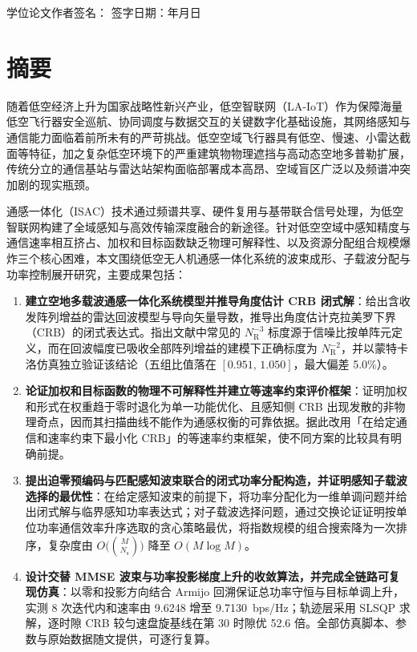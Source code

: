 \documentclass[12pt,a4paper,openany,UTF8]{ctexrep}
\begin{document}
\vspace{1.5cm}
\begin{flushright}
  学位论文作者签名：\underline{\hspace{3cm}} \qquad
  签字日期：\qquad 年\quad 月\quad 日
\end{flushright}
\newpage

\chapter*{摘\quad 要}

随着低空经济上升为国家战略性新兴产业，低空智联网（LA-IoT）作为保障海量低空飞行器安全巡航、协同调度与数据交互的关键数字化基础设施，其网络感知与通信能力面临着前所未有的严苛挑战。低空空域飞行器具有低空、慢速、小雷达截面等特征，加之复杂低空环境下的严重建筑物物理遮挡与高动态空地多普勒扩展，传统分立的通信基站与雷达站架构面临部署成本高昂、空域盲区广泛以及频谱冲突加剧的现实瓶颈。

通感一体化（ISAC）技术通过频谱共享、硬件复用与基带联合信号处理，为低空智联网构建了全域感知与高效传输深度融合的新途径。针对低空空域中感知精度与通信速率相互挤占、加权和目标函数缺乏物理可解释性、以及资源分配组合规模爆炸三个核心困难，本文围绕低空无人机通感一体化系统的波束成形、子载波分配与功率控制展开研究，主要成果包括：
\begin{enumerate}
  \item \textbf{建立空地多载波通感一体化系统模型并推导角度估计 CRB 闭式解}：给出含收发阵列增益的雷达回波模型与导向矢量导数，推导出角度估计克拉美罗下界（CRB）的闭式表达式。指出文献中常见的 $N_{\mathrm{R}}^{-3}$ 标度源于信噪比按单阵元定义，而在回波幅度已吸收全部阵列增益的建模下正确标度为 $N_{\mathrm{R}}^{-2}$，并以蒙特卡洛仿真独立验证该结论（五组比值落在 $[0.951,\,1.050]$，最大偏差 5.0\%）。
  \item \textbf{论证加权和目标函数的物理不可解释性并建立等速率约束评价框架}：证明加权和形式在权重趋于零时退化为单一功能优化、且感知侧 CRB 出现发散的非物理奇点，因而其扫描曲线不能作为通感权衡的可靠依据。据此改用「在给定通信和速率约束下最小化 CRB」的等速率约束框架，使不同方案的比较具有明确前提。
  \item \textbf{提出迫零预编码与匹配感知波束联合的闭式功率分配构造，并证明感知子载波选择的最优性}：在给定感知波束的前提下，将功率分配化为一维单调问题并给出闭式解与临界感知功率表达式；对子载波选择问题，通过交换论证证明按单位功率通信效率升序选取的贪心策略最优，将指数规模的组合搜索降为一次排序，复杂度由 $O\bigl(\binom{M}{N_{\mathrm{s}}}\bigr)$ 降至 $O(M\log M)$。
  \item \textbf{设计交替 MMSE 波束与功率投影梯度上升的收敛算法，并完成全链路可复现仿真}：以零和投影方向结合 Armijo 回溯保证总功率守恒与目标单调上升，实测 8 次迭代内和速率由 9.6248 增至 9.7130~bps/Hz；轨迹层采用 SLSQP 求解，逐时隙 CRB 较匀速盘旋基线在第 30 时隙优 52.6 倍。全部仿真脚本、参数与原始数据随文提供，可逐行复算。
\end{enumerate}
\end{document}
